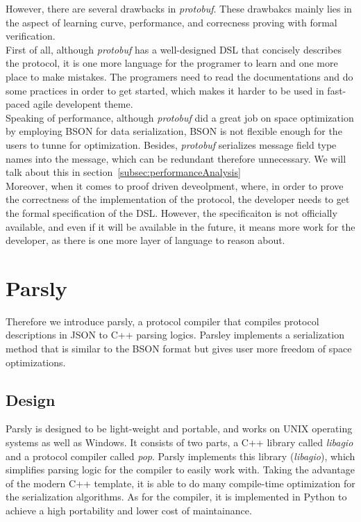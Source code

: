 \documentclass{article}
\begin{document}
However, there are several drawbacks in \textit{protobuf}. These drawbakcs mainly lies in the aspect of learning curve, performance, and correcness proving with formal verification.\\

First of all, although \textit{protobuf} has a well-designed DSL that concisely describes the protocol, it is one more language for the programer to learn and one more place to make mistakes. The programers need to read the documentations and do some practices in order to get started, which makes it harder to be used in fast-paced agile developent theme.\\

Speaking of performance, although \textit{protobuf} did a great job on space optimization by employing BSON for data serialization, BSON is not flexible enough for the users to tunne for optimization. Besides, \textit{protobuf} serializes message field type names into the message, which can be redundant therefore unnecessary. We will talk about this in section~\ref{subsec:performanceAnalysis} \\

Moreover, when it comes to proof driven deveolpment, where, in order to prove the correctness of the implementation of the protocol, the developer needs to get the formal specification of the DSL. However, the specificaiton is not officially available, and even if it will be available in the future, it means more work for the developer, as there is one more layer of language to reason about. \\


\section{Parsly}
Therefore we introduce parsly, a protocol compiler that compiles protocol descriptions in JSON to C++ parsing logics. Parsley implements a serialization method that is similar to the BSON format but gives user more freedom of space optimizations. \\

\subsection{Design}
Parsly is designed to be light-weight and portable, and works on UNIX operating systems as well as Windows. It consists of two parts, a C++ library called \textit{libagio} and a protocol compiler called \textit{pop}. Parsly implements this library (\textit{libagio}), which simplifies parsing logic for the compiler to easily work with. Taking the advantage of the modern C++ template, it is able to do many compile-time optimization for the serialization algorithms. As for the compiler, it is implemented in Python to achieve a high portability and lower cost of maintainance.  \\
\end{document}
